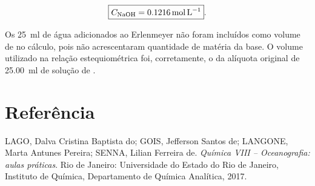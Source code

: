 \documentclass[a4paper,12pt]{article}
\begin{document}
\begin{equation*}
  \boxed{C_{\ce{NaOH}}=\qty{0.1216}{\mole\per\litre}}.
\end{equation*}

Os \qty{25}{\milli\litre} de água adicionados ao Erlenmeyer não foram
incluídos como volume de  no cálculo, pois não acrescentaram
quantidade de matéria da base. O volume utilizado na relação
estequiométrica foi, corretamente, o da alíquota original de
\qty{25.00}{\milli\litre} de solução de .

\section*{Referência}

LAGO, Dalva Cristina Baptista do; GOIS, Jefferson Santos de; LANGONE,
Marta Antunes Pereira; SENNA, Lilian Ferreira de.
\textit{Química VIII -- Oceanografia: aulas práticas}.
Rio de Janeiro: Universidade do Estado do Rio de Janeiro,
Instituto de Química, Departamento de Química Analítica, 2017.
\end{document}
